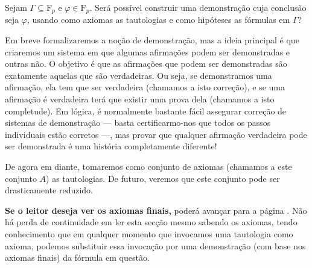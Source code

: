 \documentclass{report}
\theoremstyle{definition}
\theoremstyle{remark}
\newcommand{\F}{\mathrm{F}}
\begin{document}
	\begin{center}
	Sejam $\Gamma \subseteq \F_p$ e $\varphi \in \F_p$. Será possível construir uma demonstração cuja conclusão seja $\varphi$, usando como axiomas as tautologias e como hipóteses as fórmulas em $\Gamma$?
	\end{center}
	
	Em breve formalizaremos a noção de demonstração, mas a ideia principal é que criaremos um sistema em que algumas afirmações podem ser demonstradas e outras não. O objetivo é que as afirmações que podem ser demonstradas são exatamente aquelas que são verdadeiras. Ou seja, se demonstramos uma afirmação, ela tem que ser verdadeira (chamamos a isto correção), e se uma afirmação é verdadeira terá que existir uma prova dela (chamamos a isto completude). Em lógica, é normalmente bastante fácil assegurar correção de sistemas de demonstração --- basta certificarmo-nos que todos os passos individuais estão corretos ---, mas provar que qualquer afirmação verdadeira pode ser demonstrada é uma história completamente diferente!
	
	De agora em diante, tomaremos como conjunto de axiomas (chamamos a este conjunto $A$) as tautologias. De futuro, veremos que este conjunto pode ser drasticamente reduzido.
	
	\textbf{Se o leitor deseja ver os axiomas finais,} poderá avançar para a página \pageref{prop:axiomasfinais}. Não há perda de continuidade em ler esta secção mesmo sabendo os axiomas, tendo conhecimento que em qualquer momento que invocamos uma tautologia como axioma, podemos substituir essa invocação por uma demonstração (com base nos axiomas finais) da fórmula em questão.
	
\end{document}
